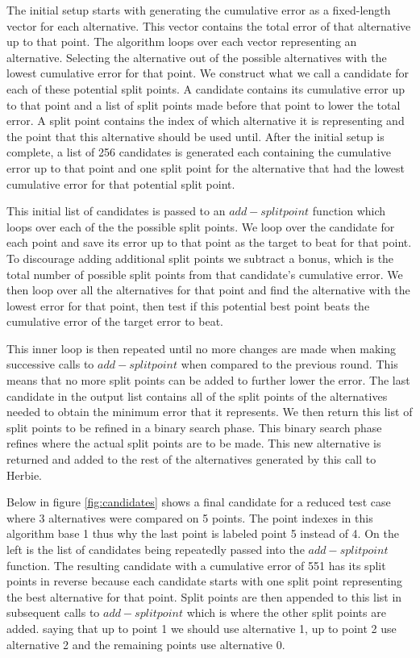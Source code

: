 \documentclass{article}
\begin{document}
The initial setup starts with generating the cumulative error as a fixed-length vector for each alternative. This vector contains the total error of that alternative up to that point. The algorithm loops over each vector representing an alternative. Selecting the alternative out of the possible alternatives with the lowest cumulative error for that point. We construct what we call a candidate for each of these potential split points. A candidate contains its cumulative error up to that point and a list of split points made before that point to lower the total error. A split point contains the index of which alternative it is representing and the point that this alternative should be used until. After the initial setup is complete, a list of 256 candidates is generated each containing the cumulative error up to that point and one split point for the alternative that had the lowest cumulative error for that potential split point.

This initial list of candidates is passed to an $add-splitpoint$  function which loops over each of the the possible split points. We loop over the candidate for each point and save its error up to that point as the target to beat for that point. To discourage adding additional split points we subtract a bonus, which is the total number of possible split points from that candidate's cumulative error. We then loop over all the alternatives for that point and find the alternative with the lowest error for that point, then test if this potential best point beats the cumulative error of the target error to beat.

This inner loop is then repeated until no more changes are made when making successive calls to $add-splitpoint$  when compared to the previous round. This means that no more split points can be added to further lower the error. The last candidate in the output list contains all of the split points of the alternatives needed to obtain the minimum error that it represents. We then return this list of split points to be refined in a binary search phase. This binary search phase refines where the actual split points are to be made. This new alternative is returned and added to the rest of the alternatives generated by this call to Herbie.

Below in figure \ref{fig:candidates} shows a final candidate for a reduced test case where 3 alternatives were compared on 5 points. The point indexes in this algorithm base 1 thus why the last point is labeled point 5 instead of 4. On the left is the list of candidates being repeatedly passed into the $add-splitpoint$  function. The resulting candidate with a cumulative error of 551 has its split points in reverse because each candidate starts with one split point representing the best alternative for that point. Split points are then appended to this list in subsequent calls to $add-splitpoint$  which is where the other split points are added. saying that up to point 1 we should use alternative 1, up to point 2 use alternative 2 and the remaining points use alternative 0.
\end{document}
